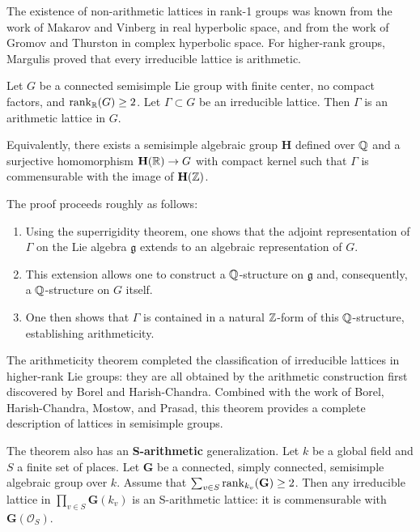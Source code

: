 The existence of non-arithmetic lattices in rank-1 groups was known from the work of Makarov and Vinberg in real hyperbolic space, and from the work of Gromov and Thurston in complex hyperbolic space. For higher-rank groups, Margulis proved that every irreducible lattice is arithmetic.

\begin{theorem}
Let \(G\) be a connected semisimple Lie group with finite center, no compact factors, and \(\rank_{\mathbb{R}}(G) \geq 2\). Let \(\Gamma \subset G\) be an irreducible lattice. Then \(\Gamma\) is an arithmetic lattice in \(G\).

Equivalently, there exists a semisimple algebraic group \(\mathbf{H}\) defined over \(\mathbb{Q}\) and a surjective homomorphism \(\mathbf{H}(\mathbb{R}) \to G\) with compact kernel such that \(\Gamma\) is commensurable with the image of \(\mathbf{H}(\mathbb{Z})\).
\end{theorem}

The proof proceeds roughly as follows:
\begin{enumerate}
    \item Using the superrigidity theorem, one shows that the adjoint representation of \(\Gamma\) on the Lie algebra \(\mathfrak{g}\) extends to an algebraic representation of \(G\).
    \item This extension allows one to construct a \(\mathbb{Q}\)-structure on \(\mathfrak{g}\) and, consequently, a \(\mathbb{Q}\)-structure on \(G\) itself.
    \item One then shows that \(\Gamma\) is contained in a natural \(\mathbb{Z}\)-form of this \(\mathbb{Q}\)-structure, establishing arithmeticity.
\end{enumerate}

The arithmeticity theorem completed the classification of irreducible lattices in higher-rank Lie groups: they are all obtained by the arithmetic construction first discovered by Borel and Harish-Chandra. Combined with the work of Borel, Harish-Chandra, Mostow, and Prasad, this theorem provides a complete description of lattices in semisimple groups.

The theorem also has an \textbf{S-arithmetic} generalization. Let \(k\) be a global field and \(S\) a finite set of places. Let \(\mathbf{G}\) be a connected, simply connected, semisimple algebraic group over \(k\). Assume that \(\sum_{v \in S} \rank_{k_v}(\mathbf{G}) \geq 2\). Then any irreducible lattice in \(\prod_{v \in S} \mathbf{G}(k_v)\) is an S-arithmetic lattice: it is commensurable with \(\mathbf{G}(\mathcal{O}_S)\).

